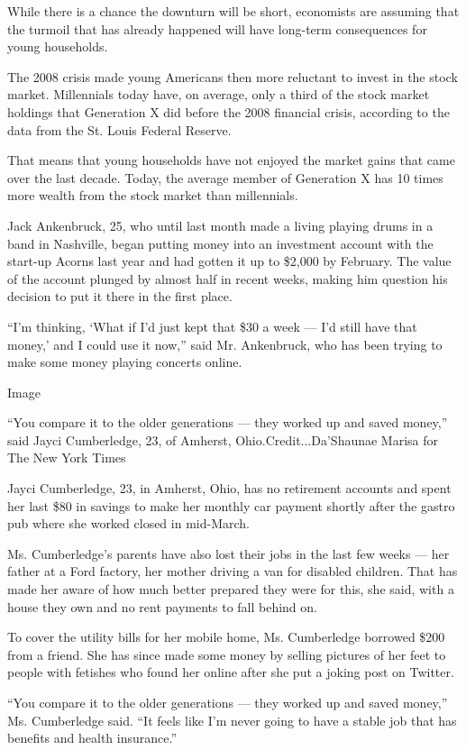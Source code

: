 While there is a chance the downturn will be short, economists are
assuming that the turmoil that has already happened will have long-term
consequences for young households.

The 2008 crisis made young Americans then more reluctant to invest in
the stock market. Millennials today have, on average, only a third of
the stock market holdings that Generation X did before the 2008
financial crisis, according to the data from the St. Louis Federal
Reserve.

That means that young households have not enjoyed the market gains that
came over the last decade. Today, the average member of Generation X has
10 times more wealth from the stock market than millennials.

Jack Ankenbruck, 25, who until last month made a living playing drums in
a band in Nashville, began putting money into an investment account with
the start-up Acorns last year and had gotten it up to \$2,000 by
February. The value of the account plunged by almost half in recent
weeks, making him question his decision to put it there in the first
place.

``I'm thinking, `What if I'd just kept that \$30 a week --- I'd still
have that money,' and I could use it now,'' said Mr. Ankenbruck, who has
been trying to make some money playing concerts online.

Image

``You compare it to the older generations --- they worked up and saved
money,'' said Jayci Cumberledge, 23, of Amherst,
Ohio.Credit...Da'Shaunae Marisa for The New York Times

Jayci Cumberledge, 23, in Amherst, Ohio, has no retirement accounts and
spent her last \$80 in savings to make her monthly car payment shortly
after the gastro pub where she worked closed in mid-March.

Ms. Cumberledge's parents have also lost their jobs in the last few
weeks --- her father at a Ford factory, her mother driving a van for
disabled children. That has made her aware of how much better prepared
they were for this, she said, with a house they own and no rent payments
to fall behind on.

To cover the utility bills for her mobile home, Ms. Cumberledge borrowed
\$200 from a friend. She has since made some money by selling pictures
of her feet to people with fetishes who found her online after she put a
joking post on Twitter.

``You compare it to the older generations --- they worked up and saved
money,'' Ms. Cumberledge said. ``It feels like I'm never going to have a
stable job that has benefits and health insurance.''

